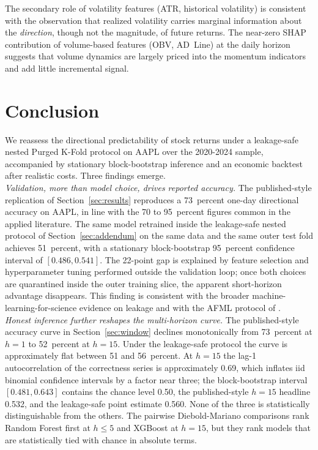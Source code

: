 \documentclass{rQUF2e}
\begin{document}
\noindent The secondary role of volatility features (ATR, historical volatility) is consistent with the observation that realized volatility carries marginal information about the \emph{direction}, though not the magnitude, of future returns. The near-zero SHAP contribution of volume-based features (OBV, AD~Line) at the daily horizon suggests that volume dynamics are largely priced into the momentum indicators and add little incremental signal.



\section{Conclusion}
\label{sec:conclusion}

We reassess the directional predictability of stock returns under
a leakage-safe nested Purged K-Fold protocol on AAPL over the
2020-2024 sample, accompanied by stationary block-bootstrap
inference and an economic backtest after realistic costs. Three
findings emerge. \\

\noindent \textit{Validation, more than model choice, drives
reported accuracy.} The published-style replication of
Section~\ref{sec:results} reproduces a 73~percent one-day
directional accuracy on AAPL, in line with the 70 to 95~percent
figures common in the applied literature. The same model
retrained inside the leakage-safe nested protocol of
Section~\ref{sec:addendum} on the same data and the same outer
test fold achieves 51~percent, with a stationary block-bootstrap
95~percent confidence interval of $[0.486, 0.541]$. The 22-point
gap is explained by feature selection and hyperparameter tuning
performed outside the validation loop; once both choices are
quarantined inside the outer training slice, the apparent
short-horizon advantage disappears. This finding is consistent
with the broader machine-learning-for-science evidence on
leakage \citep{kapoor2023leakage} and with the AFML protocol of
\citet{lopez2018advances}. \\

\noindent \textit{Honest inference further reshapes the
multi-horizon curve.} The published-style accuracy curve in
Section~\ref{sec:window} declines monotonically from 73~percent
at $h=1$ to 52~percent at $h=15$. Under the leakage-safe protocol
the curve is approximately flat between 51 and 56~percent. At
$h=15$ the lag-1 autocorrelation of the correctness series is
approximately 0.69, which inflates iid binomial confidence
intervals by a factor near three; the block-bootstrap interval
$[0.481, 0.643]$ contains the chance level 0.50, the
published-style $h=15$ headline 0.532, and the leakage-safe point
estimate 0.560. None of the three is statistically distinguishable
from the others. The pairwise Diebold-Mariano comparisons rank
Random Forest first at $h \le 5$ and XGBoost at $h=15$, but they
rank models that are statistically tied with chance in absolute
terms. \\
\end{document}
